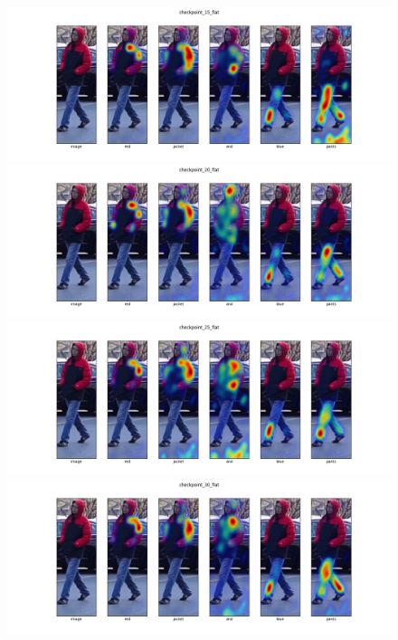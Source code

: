 \begin{figure}
  \includegraphics[options]{img/mrtd_masking_ratio/mrtd-checkpoint_15_flat.png}
  \includegraphics[options]{img/mrtd_masking_ratio/mrtd-checkpoint_20_flat.png}
  \includegraphics[options]{img/mrtd_masking_ratio/mrtd-checkpoint_25_flat.png}
  \includegraphics[options]{img/mrtd_masking_ratio/mrtd-checkpoint_30_flat.png}

\end{figure}

